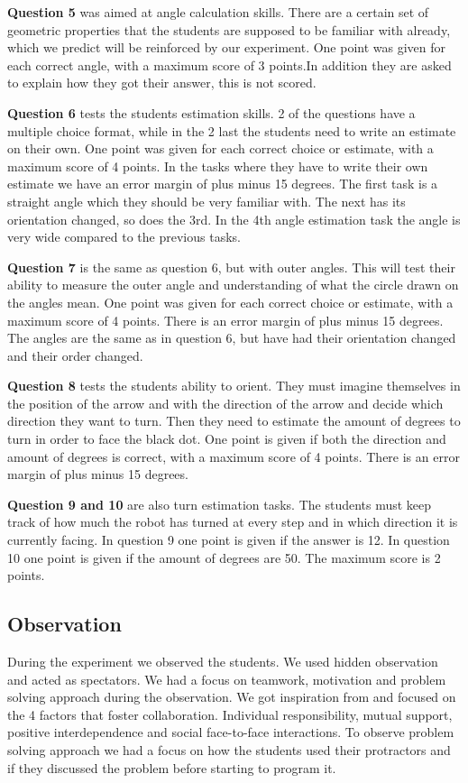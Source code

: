 \bigskip\noindent
\textbf{Question 5} was aimed at angle calculation skills. There are a certain set of geometric properties that the students are supposed to be familiar with already, which we predict will be reinforced by our experiment. One point was given for each correct angle, with a maximum score of 3 points.In addition they are asked to explain how they got their answer, this is not scored.

\bigskip\noindent
\textbf{Question 6} tests the students estimation skills. 2 of the questions have a multiple choice format, while in the 2 last the students need to write an estimate on their own. One point was given for each correct choice or estimate, with a maximum score of 4 points. In the tasks where they have to write their own estimate we have an error margin of plus minus 15 degrees. The first task is a straight angle which they should be very familiar with. The next has its orientation changed, so does the 3rd. In the 4th angle estimation task the angle is very wide compared to the previous tasks. 

\bigskip\noindent
\textbf{Question 7} is the same as question 6, but with outer angles. This will test their ability to measure the outer angle and understanding of what the circle drawn on the angles mean. One point was given for each correct choice or estimate, with a maximum score of 4 points. There is an error margin of plus minus 15 degrees. The angles are the same as in question 6, but have had their orientation changed and their order changed. 

\bigskip\noindent
\textbf{Question 8} tests the students ability to orient. They must imagine themselves in the position of the arrow and with the direction of the arrow and decide which direction they want to turn. Then they need to estimate the amount of degrees to turn in order to face the black dot. One point is given if both the direction and amount of degrees is correct, with a maximum score of 4 points. There is an error margin of plus minus 15 degrees. 

\bigskip\noindent
\textbf{Question 9 and 10} are also turn estimation tasks. The students must keep track of how much the robot has turned at every step and in which direction it is currently facing. In question 9 one point is given if the answer is 12. In question 10 one point is given if the amount of degrees are 50. The maximum score is 2 points.

\subsection*{Observation}
During the experiment we observed the students. We used hidden observation and acted as spectators. We had a focus on teamwork, motivation and problem solving approach during the observation. We got inspiration from  and focused on the 4 factors that foster collaboration. Individual responsibility, mutual support, positive interdependence and social face-to-face interactions. To observe problem solving approach we had a focus on how the students used their protractors and if they discussed the problem before starting to program it.

